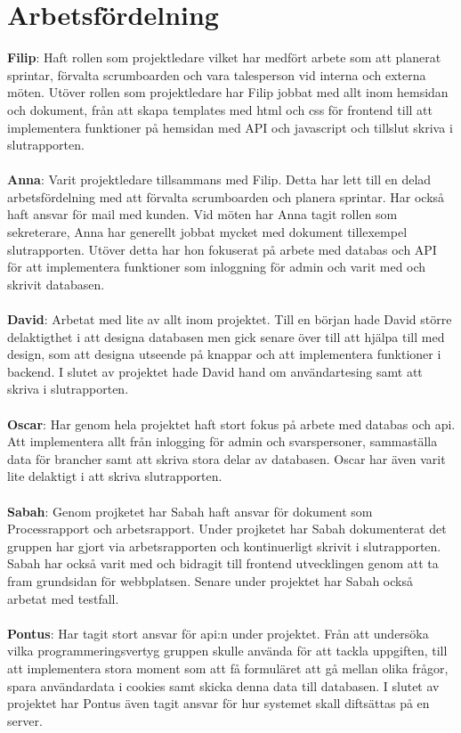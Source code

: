 \documentclass[12pt]{article}
\begin{document}
\section{Arbetsfördelning}
\textbf{Filip}: Haft rollen som projektledare vilket har medfört arbete som att planerat sprintar, förvalta scrumboarden och vara talesperson vid interna och externa möten. Utöver rollen som projektledare har Filip jobbat med allt inom hemsidan och dokument, från att skapa templates med html och css för frontend till att implementera funktioner på hemsidan med API och javascript och tillslut skriva i slutrapporten.\\\\
\textbf{Anna}: Varit projektledare tillsammans med Filip. Detta har lett till en delad arbetsfördelning med att förvalta scrumboarden och planera sprintar. Har också haft ansvar för mail med kunden. Vid möten har Anna tagit rollen som sekreterare, Anna har generellt jobbat mycket med dokument tillexempel slutrapporten. Utöver detta har hon fokuserat på arbete med databas och API för att implementera funktioner som inloggning för admin  och varit med och skrivit databasen.\\\\
\textbf{David}: Arbetat med lite av allt inom projektet. Till en början hade David större delaktigthet i att designa databasen men gick senare över till att hjälpa till med design, som att designa utseende på knappar och att implementera funktioner i backend. I slutet av projektet hade David hand om användartesing samt att skriva i slutrapporten.\\\\
\textbf{Oscar}: Har genom hela projektet haft stort fokus på arbete med databas och api. Att implementera allt från inlogging för admin och svarspersoner, sammaställa data för brancher samt att skriva stora delar av databasen. Oscar har även varit lite delaktigt i att skriva slutrapporten.\\\\
\textbf{Sabah}: Genom projketet har Sabah haft ansvar för dokument som Processrapport och arbetsrapport. Under projketet har Sabah dokumenterat det gruppen har gjort via arbetsrapporten och kontinuerligt skrivit i slutrapporten. Sabah har också varit med och bidragit till frontend utvecklingen genom att ta fram grundsidan för webbplatsen. Senare under projektet har Sabah också arbetat med testfall.\\\\
\textbf{Pontus}: Har tagit stort ansvar för api:n under projektet. Från att undersöka vilka programmeringsvertyg gruppen skulle använda för att tackla uppgiften, till att implementera stora moment som att få formuläret att gå mellan olika frågor, spara användardata i cookies samt skicka denna data till databasen. I slutet av projektet har Pontus även tagit ansvar för hur  systemet skall diftsättas på en server.\\\\
\end{document}
